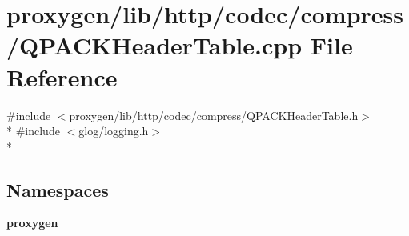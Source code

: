 \section{proxygen/lib/http/codec/compress/\+Q\+P\+A\+C\+K\+Header\+Table.cpp File Reference}
\label{QPACKHeaderTable_8cpp}
{\ttfamily \#include $<$proxygen/lib/http/codec/compress/\+Q\+P\+A\+C\+K\+Header\+Table.\+h$>$}\\*
{\ttfamily \#include $<$glog/logging.\+h$>$}\\*
\subsection*{Namespaces}
\begin{DoxyCompactItemize}
\item 
 {\bf proxygen}
\end{DoxyCompactItemize}

